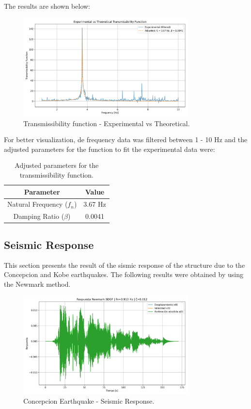 \documentclass{article}  %
\begin{document}
The results are shown below:

\begin{figure}[H]
  \centering
  \includegraphics[width=0.8\textwidth]{GRAFICOS/TR_vs_teorico.png}
  \caption{Transmissibility function - Experimental vs Theoretical.}
  \label{fig:transmissibility}
\end{figure}

For better visualization, de frequency data was filtered between 1 - 10 Hz and the adjusted parameters for the function to fit the experimental data were:

\begin{table}[H]
\centering
\caption{Adjusted parameters for the transmissibility function.}
\begin{tabular}{|c|c|}
\hline
\textbf{Parameter} & \textbf{Value} \\ \hline
Natural Frequency ($f_n$) & 3.67 Hz \\ \hline
Damping Ratio ($\beta$) & 0.0041 \\ \hline
\end{tabular}
\end{table}

\subsection{Seismic Response}

This section presents the result of the sismic response of the structure due to the Concepcion and Kobe earthquakes. The following results were obtained by using the Newmark method.

\begin{figure}[H]
  \centering
  \includegraphics[width=0.8\textwidth]{GRAFICOS/respnewmark_Concepcion.png}
  \caption{Concepcion Earthquake - Seismic Response.}
  \label{fig:concepcion}
\end{figure}
\end{document}
